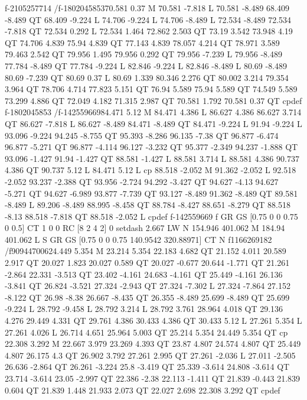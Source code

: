 f-2105257714
/f-1802045853{70.581 0.37 M
70.581 -7.818 L
70.581 -8.489 68.409 -8.489 QT
68.409 -9.224 L
74.706 -9.224 L
74.706 -8.489 L
72.534 -8.489 72.534 -7.818 QT
72.534 0.292 L
72.534 1.464 72.862 2.503 QT
73.19 3.542 73.948 4.19 QT
74.706 4.839 75.94 4.839 QT
77.143 4.839 78.057 4.214 QT
78.971 3.589 79.463 2.542 QT
79.956 1.495 79.956 0.292 QT
79.956 -7.239 L
79.956 -8.489 77.784 -8.489 QT
77.784 -9.224 L
82.846 -9.224 L
82.846 -8.489 L
80.69 -8.489 80.69 -7.239 QT
80.69 0.37 L
80.69 1.339 80.346 2.276 QT
80.002 3.214 79.354 3.964 QT
78.706 4.714 77.823 5.151 QT
76.94 5.589 75.94 5.589 QT
74.549 5.589 73.299 4.886 QT
72.049 4.182 71.315 2.987 QT
70.581 1.792 70.581 0.37 QT
cp}def
f-1802045853
/f-142559669{84.471 5.12 M
84.471 4.386 L
86.627 4.386 86.627 3.714 QT
86.627 -7.818 L
86.627 -8.489 84.471 -8.489 QT
84.471 -9.224 L
91.94 -9.224 L
93.096 -9.224 94.245 -8.755 QT
95.393 -8.286 96.135 -7.38 QT
96.877 -6.474 96.877 -5.271 QT
96.877 -4.114 96.127 -3.232 QT
95.377 -2.349 94.237 -1.888 QT
93.096 -1.427 91.94 -1.427 QT
88.581 -1.427 L
88.581 3.714 L
88.581 4.386 90.737 4.386 QT
90.737 5.12 L
84.471 5.12 L
cp
88.518 -2.052 M
91.362 -2.052 L
92.518 -2.052 93.237 -2.388 QT
93.956 -2.724 94.292 -3.427 QT
94.627 -4.13 94.627 -5.271 QT
94.627 -6.989 93.877 -7.739 QT
93.127 -8.489 91.362 -8.489 QT
89.581 -8.489 L
89.206 -8.489 88.995 -8.458 QT
88.784 -8.427 88.651 -8.279 QT
88.518 -8.13 88.518 -7.818 QT
88.518 -2.052 L
cp}def
f-142559669
f
GR
GS
[0.75 0 0 0.75 0 0.5] CT
1 0 0 RC
[8 2 4 2] 0 setdash
2.667 LW
N
154.946 401.062 M
184.94 401.062 L
S
GR
GS
[0.75 0 0 0.75 140.9542 320.88971] CT
N
f1166269182
/f909447006{24.449 5.354 M
23.214 5.354 22.183 4.682 QT
21.152 4.011 20.589 2.917 QT
20.027 1.823 20.027 0.589 QT
20.027 -0.677 20.644 -1.771 QT
21.261 -2.864 22.331 -3.513 QT
23.402 -4.161 24.683 -4.161 QT
25.449 -4.161 26.136 -3.841 QT
26.824 -3.521 27.324 -2.943 QT
27.324 -7.302 L
27.324 -7.864 27.152 -8.122 QT
26.98 -8.38 26.667 -8.435 QT
26.355 -8.489 25.699 -8.489 QT
25.699 -9.224 L
28.792 -9.458 L
28.792 3.214 L
28.792 3.761 28.964 4.018 QT
29.136 4.276 29.449 4.331 QT
29.761 4.386 30.433 4.386 QT
30.433 5.12 L
27.261 5.354 L
27.261 4.026 L
26.714 4.651 25.964 5.003 QT
25.214 5.354 24.449 5.354 QT
cp
22.308 3.292 M
22.667 3.979 23.269 4.393 QT
23.87 4.807 24.574 4.807 QT
25.449 4.807 26.175 4.3 QT
26.902 3.792 27.261 2.995 QT
27.261 -2.036 L
27.011 -2.505 26.636 -2.864 QT
26.261 -3.224 25.8 -3.419 QT
25.339 -3.614 24.808 -3.614 QT
23.714 -3.614 23.05 -2.997 QT
22.386 -2.38 22.113 -1.411 QT
21.839 -0.443 21.839 0.604 QT
21.839 1.448 21.933 2.073 QT
22.027 2.698 22.308 3.292 QT
cp}def
